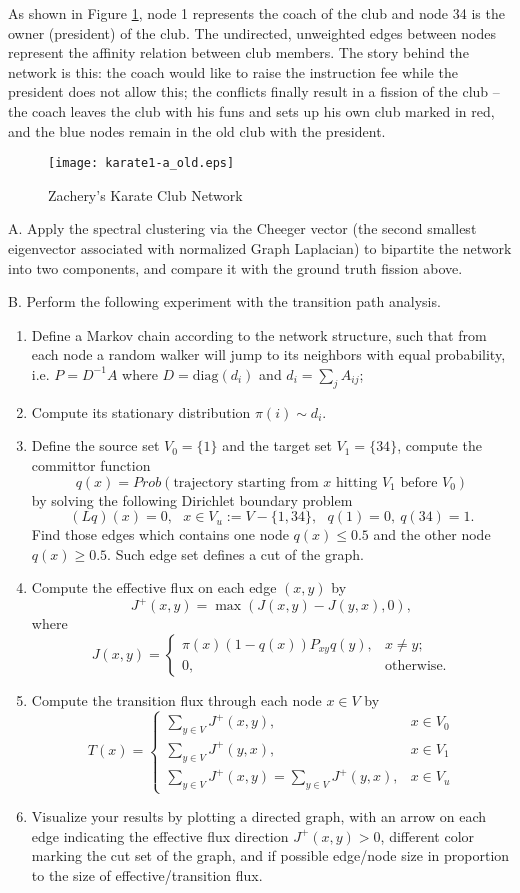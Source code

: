 \documentclass[11pt]{article}
\def\diag{{\mathrm{diag}}}
\begin{document}
As shown in Figure \ref{fig:karate}, node 1 represents the coach of the club and node 34 is the owner (president) of the club. The undirected, unweighted edges between nodes represent
the affinity relation between club members. The story behind the network is this: the coach would like to raise the instruction fee while the president does not allow this; the conflicts finally result in a fission of the club -- the coach leaves the club with his funs and sets up his own club marked in red, and the blue nodes remain in the old club with the president.  
\begin{figure}[h]
\centering
\texttt{[image: karate1-a\_old.eps]}
\caption{Zachery's Karate Club Network}\label{fig:karate}
\end{figure}

A. Apply the spectral clustering via the Cheeger vector (the second smallest eigenvector associated with normalized Graph Laplacian) to bipartite the network into two components, and compare it with the ground truth fission above.  

B. Perform the following experiment with the transition path analysis. 
\begin{enumerate}
\item Define a Markov chain according to the network structure, such that from each node a random walker will jump to its neighbors with equal probability, i.e. $P=D^{-1} A$ where $D=\diag(d_i)$ and $d_i = \sum_j A_{ij}$;
\item Compute its stationary distribution $\pi(i)\sim d_i$. 
\item Define the source set $V_0=\{1\}$ and the target set $V_1=\{34\}$, compute the committor function
\[  q(x) = Prob(\mbox{trajectory starting from $x$ hitting $V_1$ before $V_0$}) \]
by solving the following Dirichlet boundary problem
\[ (L q)(x) = 0, \ \ \ x\in V_u := V -\{1,34\}, \ \ \ q(1)=0,\ q(34)=1. \]
Find those edges which contains one node $q(x)\leq 0.5$ and the other node $q(x)\geq 0.5$. Such edge set defines a cut of the graph. 
\item Compute the effective flux on each edge $(x,y)$ by 
\[ J^+(x,y) = \max(J(x,y) - J(y,x), 0 ),\]
where
\[     J(x,y) = 
     \begin{cases}
       \pi(x) (1-q(x)) P_{xy}q(y), & x\neq y;\\
       0, & \text{otherwise}.
     \end{cases}
\]
\item Compute the transition flux through each node $x\in V$ by 
\[
     T(x) = \left\{\begin{array}{ll}
     \sum_{y \in V} J^+(x,y) ,& x\in V_0 \\
     \sum_{y\in V} J^+(y,x), & x\in V_1 \\
     \sum_{y\in V} J^+(x,y) = \sum_{y\in V} J^+(y,x), & x\in V_u 
     \end{array}\right.
\]
\item Visualize your results by plotting a directed graph, with an arrow on each edge indicating the effective flux direction $J^+(x,y)>0$, different color marking the cut set of the graph, and if possible edge/node size in proportion to the size of effective/transition flux.
\end{enumerate}
\end{document}
